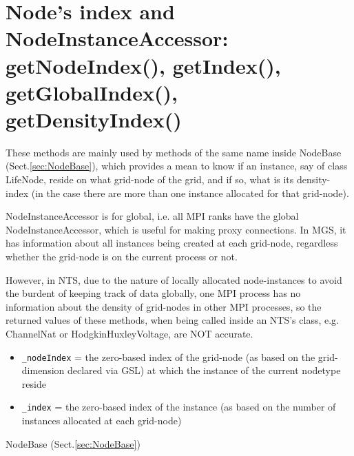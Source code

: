 \section{Node's index and NodeInstanceAccessor: getNodeIndex(), getIndex(),
getGlobalIndex(), getDensityIndex()}
\label{sec:getIndex()}
\label{sec:getGlobalIndex()}
\label{sec:getNodeIndex()}
\label{sec:getDensityIndex()}

These methods are mainly used by methods of the same name inside NodeBase
(Sect.\ref{sec:NodeBase}), which provides a mean to know if an instance, say of
class LifeNode, reside on what grid-node of the grid, and if so, what is its
density-index (in the case there are more than one instance allocated for that
grid-node).

NodeInstanceAccessor is for global, i.e. all MPI ranks have the global
NodeInstanceAccessor, which is useful for making proxy connections. In MGS, it
has information about all instances being created at each grid-node, regardless
whether the grid-node is on the current process or not.

However, in NTS, due to the nature of locally allocated node-instances to avoid
the burdent of keeping track of data globally, one MPI process has no
information about the density of grid-nodes in other MPI processes, so the
returned values of these methods, when being called inside an NTS's class, e.g.
ChannelNat or HodgkinHuxleyVoltage, are NOT accurate.


\begin{itemize}
  
  \item \verb!_nodeIndex!  = the zero-based index of the grid-node (as based on the
  grid-dimension declared via GSL) at which the instance of the current nodetype
  reside
  
  \item \verb!_index!      = the zero-based index of the instance (as based on the number
  of instances allocated at each grid-node)
  
\end{itemize}

NodeBase (Sect.\ref{sec:NodeBase})

